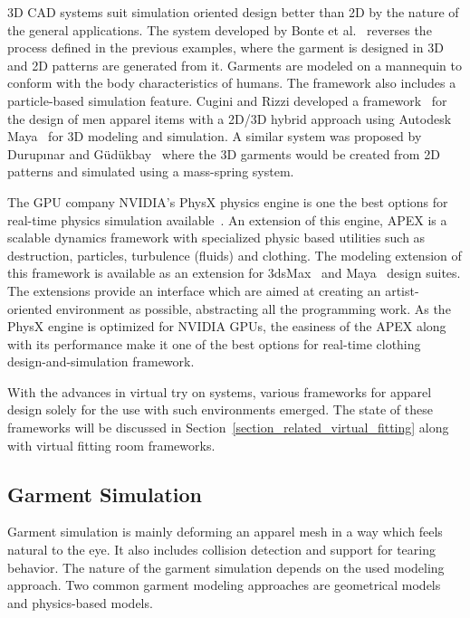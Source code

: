  3D CAD systems suit simulation oriented design better than 2D by the nature of the general applications. The system developed by Bonte et al.~\cite{Bonte2002} reverses the process defined in the previous examples, where the garment is designed in 3D and 2D patterns are generated from it. Garments are modeled on a mannequin to conform with the body characteristics of humans. The framework also includes a particle-based simulation feature. Cugini and Rizzi developed a framework~\cite{Cugini2002} for the design of men apparel items with a 2D/3D hybrid approach using Autodesk Maya~\cite{Autodesk2013} for 3D modeling and simulation. A similar system was proposed by Durup{\i}nar and G{\"u}d{\"u}kbay~\cite{Durupinar2007} where the 3D garments  would be created from 2D patterns and simulated using a mass-spring system.
 
 The GPU company NVIDIA's PhysX physics engine is one the best options for real-time physics simulation available~\cite{WikiPhysx2012}. An extension of this engine, APEX is a scalable dynamics framework with specialized physic based utilities such as destruction, particles, turbulence (fluids) and clothing\cite{Nvidia2013}. The modeling extension of this framework is available as an extension for 3dsMax~\cite{Autodesk3DS2013} and Maya~\cite{Autodesk2013} design suites. The extensions provide an interface which are aimed at creating an artist-oriented environment as possible, abstracting all the programming work. As the PhysX engine is optimized for NVIDIA GPUs, the easiness of the APEX along with its performance make it one of the  best options for real-time clothing design-and-simulation framework.  
 
With the advances in virtual try on systems, various frameworks for apparel design solely for the use with such environments emerged. The state of these frameworks will be discussed in Section~\ref{section_related_virtual_fitting} along with virtual fitting room frameworks.  
   
\subsection{Garment Simulation}
Garment simulation is mainly deforming an apparel mesh in a way which feels natural to the eye. It also includes collision detection and support for tearing behavior. The nature of the garment simulation depends on the used modeling approach. Two common garment modeling approaches are geometrical models~\cite{Weil1986} and physics-based models. 

